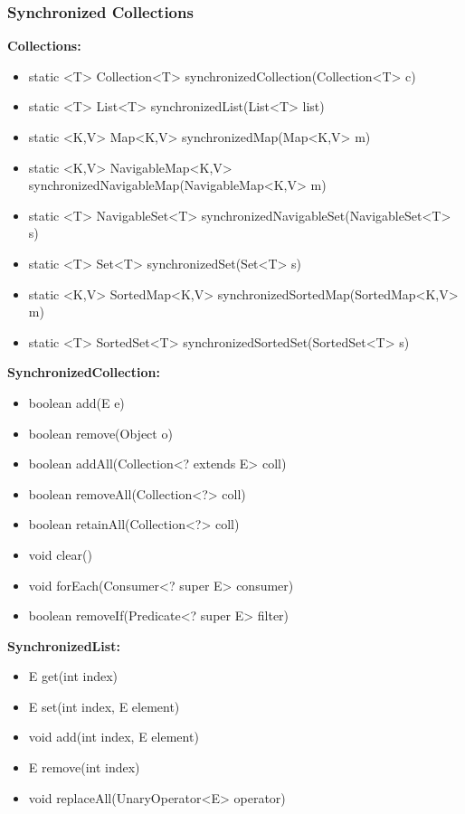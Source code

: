 \documentclass[]{usiinfthesis}
\begin{document}
\subsubsection{Synchronized Collections}

\small{
\noindent
\textbf{Collections:}
\begin{itemize}
    \item   static <T> Collection<T> synchronizedCollection(Collection<T> c)
    \item   static <T> List<T> synchronizedList(List<T> list)
    \item   static <K,V> Map<K,V> synchronizedMap(Map<K,V> m)
    \item   static <K,V> NavigableMap<K,V> synchronizedNavigableMap(NavigableMap<K,V> m)
    \item   static <T> NavigableSet<T> synchronizedNavigableSet(NavigableSet<T> s)
    \item   static <T> Set<T> synchronizedSet(Set<T> s)
    \item   static <K,V> SortedMap<K,V> synchronizedSortedMap(SortedMap<K,V> m)
    \item   static <T> SortedSet<T> synchronizedSortedSet(SortedSet<T> s)
\end{itemize}

\noindent
\textbf{SynchronizedCollection:}
\begin{itemize}
    \item   boolean add(E e)
    \item   boolean remove(Object o)
    \item   boolean addAll(Collection<? extends E> coll)
    \item   boolean removeAll(Collection<?> coll)
    \item   boolean retainAll(Collection<?> coll)
    \item   void clear()
    \item   void forEach(Consumer<? super E> consumer)
    \item   boolean removeIf(Predicate<? super E> filter)
\end{itemize}

\noindent
\textbf{SynchronizedList:}
\begin{itemize}
    \item   E get(int index)
    \item   E set(int index, E element)
    \item   void add(int index, E element)
    \item   E remove(int index)
    \item   void replaceAll(UnaryOperator<E> operator)
\end{itemize}

}
\end{document}

